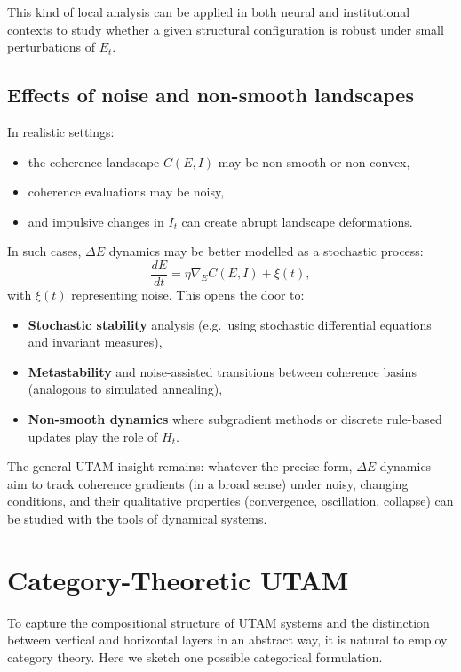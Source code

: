 \documentclass[12pt,a4paper]{report}
\begin{document}
This kind of local analysis can be applied in both neural and institutional contexts to study whether a given structural configuration is robust under small perturbations of \(E_t\).

\subsection*{Effects of noise and non-smooth landscapes}

In realistic settings:

\begin{itemize}[leftmargin=2em]
    \item the coherence landscape \(C(E, I)\) may be non-smooth or non-convex,
    \item coherence evaluations may be noisy,
    \item and impulsive changes in \(I_t\) can create abrupt landscape deformations.
\end{itemize}

In such cases, $\Delta E$ dynamics may be better modelled as a stochastic process:
\[
    \frac{dE}{dt} = \eta \nabla_E C(E, I) + \xi(t),
\]
with \(\xi(t)\) representing noise. This opens the door to:

\begin{itemize}[leftmargin=2em]
    \item \textbf{Stochastic stability} analysis (e.g.\ using stochastic differential equations and invariant measures),
    \item \textbf{Metastability} and noise-assisted transitions between coherence basins (analogous to simulated annealing),
    \item \textbf{Non-smooth dynamics} where subgradient methods or discrete rule-based updates play the role of \(H_t\).
\end{itemize}

The general UTAM insight remains: whatever the precise form, $\Delta E$ dynamics aim to track coherence gradients (in a broad sense) under noisy, changing conditions, and their qualitative properties (convergence, oscillation, collapse) can be studied with the tools of dynamical systems.

\section{Category-Theoretic UTAM}

To capture the compositional structure of UTAM systems and the distinction between vertical and horizontal layers in an abstract way, it is natural to employ category theory. Here we sketch one possible categorical formulation.
\end{document}
